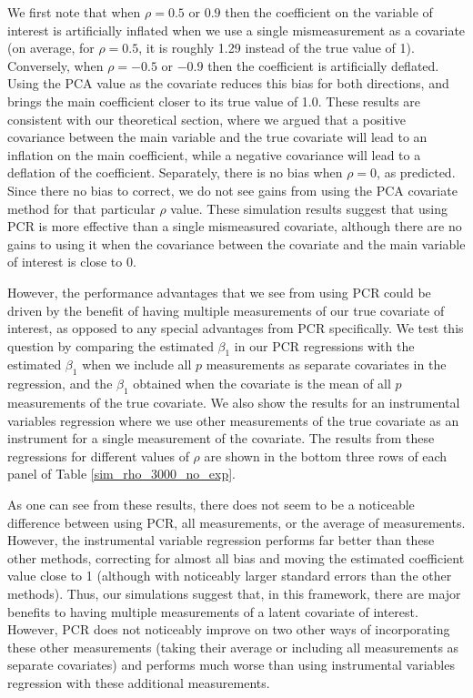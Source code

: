 \documentclass[10pt]{article}
\begin{document}
        We first note that when $\rho = 0.5$ or $0.9$ then the coefficient on the variable of interest is artificially inflated when we use a single mismeasurement as a covariate (on average, for $\rho = 0.5$, it is roughly 1.29 instead of the true value of 1). Conversely, when $\rho = -0.5$ or $-0.9$ then the coefficient is artificially deflated. Using the PCA value as the covariate reduces this bias for both directions, and brings the main coefficient closer to its true value of 1.0. These results are consistent with our theoretical section, where we argued that a positive covariance between the main variable and the true covariate will lead to an inflation on the main coefficient, while a negative covariance will lead to a deflation of the coefficient. Separately, there is no bias when $\rho = 0$, as predicted. Since there no bias to correct, we do not see gains from using the PCA covariate method for that particular $\rho$ value. These simulation results suggest that using PCR is more effective than a single mismeasured covariate, although there are no gains to using it when the covariance between the covariate and the main variable of interest is close to $0$. 

        However, the performance advantages that we see from using PCR could be driven by the benefit of having multiple measurements of our true covariate of interest, as opposed to any special advantages from PCR specifically. We test this question by comparing the estimated $\beta_1$ in our PCR regressions with the estimated $\beta_1$ when we include all $p$ measurements as separate covariates in the regression, and the $\beta_1$ obtained when the covariate is the mean of all $p$ measurements of the true covariate. We also show the results for an instrumental variables regression where we use other measurements of the true covariate as an instrument for a single measurement of the covariate. The results from these regressions for different values of $\rho$ are shown in the bottom three rows of each panel of Table \ref{sim_rho_3000_no_exp}.

        As one can see from these results, there does not seem to be a noticeable difference between using PCR, all measurements, or the average of measurements. However, the instrumental variable regression performs far better than these other methods, correcting for almost all bias and moving the estimated coefficient value close to 1 (although with noticeably larger standard errors than the other methods). Thus, our simulations suggest that, in this framework, there are major benefits to having multiple measurements of a latent covariate of interest. However, PCR does not noticeably improve on two other ways of incorporating these other measurements (taking their average or including all measurements as separate covariates) and performs much worse than using instrumental variables regression with these additional measurements.
\end{document}
